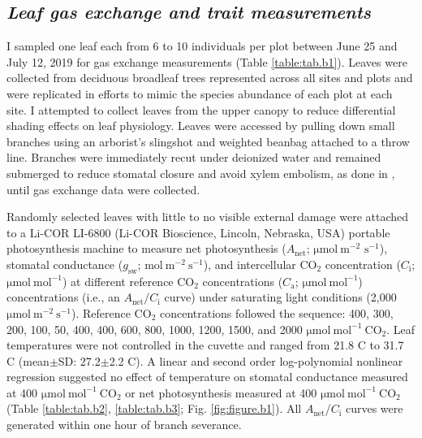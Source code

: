 \subsection{\textit{Leaf gas exchange and trait measurements}}
\noindent I sampled one leaf each from 6 to 10 individuals per plot between June 25 and July 12, 2019 for gas exchange measurements (Table \ref{table:tab.b1}). Leaves were collected from deciduous broadleaf trees represented across all sites and plots and were replicated in efforts to mimic the species abundance of each plot at each site. I attempted to collect leaves from the upper canopy to reduce differential shading effects on leaf physiology. Leaves were accessed by pulling down small branches using an arborist’s slingshot and weighted beanbag attached to a throw line. Branches were immediately recut under deionized water and remained submerged to reduce stomatal closure and avoid xylem embolism, as done in , until gas exchange data were collected.

Randomly selected leaves with little to no visible external damage were attached to a Li-COR LI-6800 (Li-COR Bioscience, Lincoln, Nebraska, USA) portable photosynthesis machine to measure net photosynthesis ($A_\mathrm{net}$; $\mathrm{\mu mol\ m^{-2}}$ $\mathrm{{s}^{-1}}$), stomatal conductance ($g_\mathrm{sw}$; $\mathrm{mol\ m^{-2}\ s^{-1}}$), and intercellular CO$_2$ concentration ($C_\mathrm{i}$; $\mathrm{\mu mol\ mol^{-1}}$) at different reference CO$_2$ concentrations ($C_\mathrm{a}$; $\mathrm{\mu mol\ mol^{-1}}$) concentrations (i.e., an $A_\mathrm{net}/C_\mathrm{i}$ curve) under saturating light conditions (2,000 $\mathrm{\mu mol\ m^{-2}\ s^{-1}}$). Reference CO$_2$ concentrations followed the sequence: 400, 300, 200, 100, 50, 400, 400, 600, 800, 1000, 1200, 1500, and 2000 $\mathrm{\mu mol\ mol^{-1}\ CO_2}$. Leaf temperatures were not controlled in the cuvette and ranged from 21.8 \textdegree{}C to 31.7 \textdegree{}C (mean$\pm$SD: 27.2$\pm$2.2 \textdegree{}C). A linear and second order log-polynomial nonlinear regression suggested no effect of temperature on stomatal conductance measured at 400 $\mathrm{\mu mol\ mol^{-1}\ CO_2}$ or net photosynthesis measured at 400 $\mathrm{\mu mol\ mol^{-1}\ CO_2}$ (Table \ref{table:tab.b2}, \ref{table:tab.b3}; Fig. \ref{fig:figure.b1}). All $A_\mathrm{net}$/$C_\mathrm{i}$ curves were generated within one hour of branch severance.

